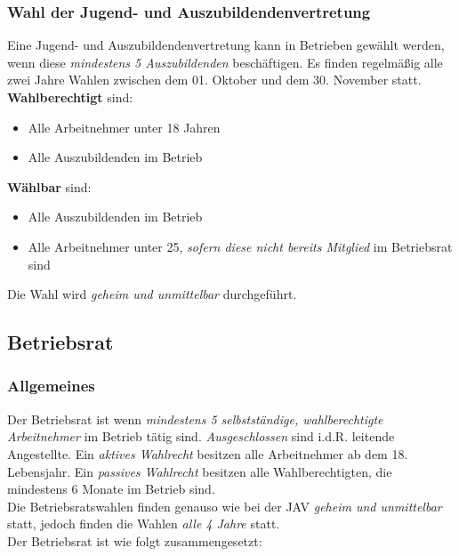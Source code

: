 \documentclass[a4paper, 12pt]{report}
\begin{document}
\begin{multicols}{2}
\subsubsection{Wahl der Jugend- und Auszubildendenvertretung}

Eine Jugend- und Auszubildendenvertretung kann in Betrieben gewählt werden,
wenn diese \emph{mindestens 5 Auszubildenden} beschäftigen. Es finden
regelmäßig alle zwei Jahre  Wahlen zwischen dem 01. Oktober und dem 30. November
statt. \\

\textbf{Wahlberechtigt} sind:

\begin{itemize}
    \item Alle Arbeitnehmer unter 18 Jahren
    \item Alle Auszubildenden im Betrieb
\end{itemize}

\textbf{Wählbar} sind:
\begin{itemize}
    \item Alle Auszubildenden im Betrieb
    \item Alle Arbeitnehmer unter 25, \emph{sofern diese nicht bereits Mitglied}
	im Betriebsrat sind
\end{itemize}

Die Wahl wird \emph{geheim und unmittelbar} durchgeführt.

\subsection{Betriebsrat}

\subsubsection{Allgemeines}

Der Betriebsrat ist wenn \emph{mindestens 5 selbstständige, wahlberechtigte
Arbeitnehmer} im Betrieb tätig sind. \emph{Ausgeschlossen} sind i.d.R. leitende
Angestellte. Ein \emph{aktives Wahlrecht} besitzen alle Arbeitnehmer ab dem 18.
Lebensjahr. Ein \emph{passives Wahlrecht} besitzen alle Wahlberechtigten, die
mindestens 6 Monate im Betrieb sind. \\

Die Betriebsratswahlen finden genauso wie bei der JAV \emph{geheim und
unmittelbar} statt, jedoch finden die Wahlen \emph{alle 4 Jahre} statt. \\

Der Betriebsrat ist wie folgt zusammengesetzt:


\end{multicols}
\end{document}
